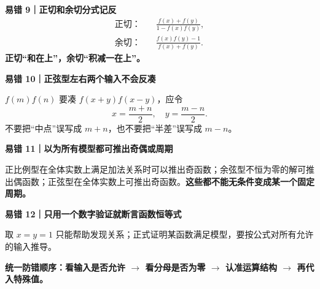 \FReserve{3.5cm}
\begin{trapbox}
\textbf{\textcolor{CTrap}{易错 9｜正切和余切分式记反}}
\[
\begin{aligned}
\text{正切：}&\quad\frac{f(x)+f(y)}{1-f(x)f(y)},\\[4pt]
\text{余切：}&\quad\frac{f(x)f(y)-1}{f(x)+f(y)}.
\end{aligned}
\]
\textbf{正切“和在上”，余切“积减一在上”。}

\textbf{\textcolor{CTrap}{易错 10｜正弦型左右两个输入不会反凑}}

$f(m)f(n)$ 要凑 $f(x+y)f(x-y)$，应令
\[
 x=\frac{m+n}2,\quad y=\frac{m-n}2.
\]
不要把“中点”误写成 $m+n$，也不要把“半差”误写成 $m-n$。
\end{trapbox}

\FReserve{3.5cm}
\begin{trapbox}
\textbf{\textcolor{CTrap}{易错 11｜以为所有模型都可推出奇偶或周期}}

正比例型在全体实数上满足加法关系时可以推出奇函数；余弦型不恒为零的解可推出偶函数；正弦型在全体实数上可推出奇函数。\textbf{这些都不能无条件变成某一个固定周期。}

\textbf{\textcolor{CTrap}{易错 12｜只用一个数字验证就断言函数恒等式}}

取 $x=y=1$ 只能帮助发现关系；正式证明某函数满足模型，要按公式对所有允许的输入推导。

\textbf{统一防错顺序：}\textbf{看输入是否允许 $\longrightarrow$ 看分母是否为零 $\longrightarrow$ 认准运算结构 $\longrightarrow$ 再代入特殊值。}
\end{trapbox}


